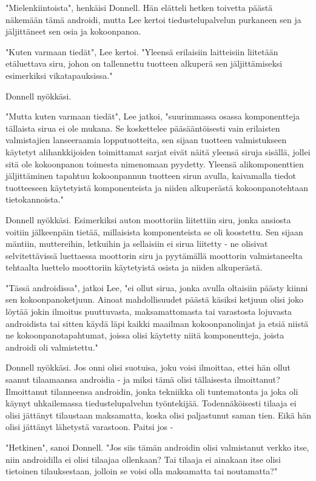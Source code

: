 "Mielenkiintoista", henkäisi Donnell. Hän elätteli hetken toivetta päästä näkemään tämä androidi, mutta Lee kertoi tiedustelupalvelun purkaneen sen ja jäljittäneet sen osia ja kokoonpanoa.


"Kuten varmaan tiedät", Lee kertoi. "Yleensä erilaisiin laitteisiin liitetään etäluettava siru, johon on tallennettu tuotteen alkuperä sen jäljittämiseksi esimerkiksi vikatapauksissa."


Donnell nyökkäsi.


"Mutta kuten varmaan tiedät", Lee jatkoi, "suurimmassa osassa komponentteja tällaista sirua ei ole mukana. Se koskettelee pääsääntöisesti vain erilaisten valmistajien lanseeraamia lopputuotteita, sen sijaan tuotteen valmistukseen käytetyt alihankkijoiden toimittamat sarjat eivät näitä yleensä siruja sisällä, jollei sitä ole kokoonpanon toimesta nimenomaan pyydetty. Yleensä alikomponenttien jäljittäminen tapahtuu kokoonpannun tuotteen sirun avulla, kaivamalla tiedot tuotteeseen käytetyistä komponenteista ja niiden alkuperästä kokoonpanotehtaan tietokannoista."


Donnell nyökkäsi. Esimerkiksi auton moottoriin liitettiin siru, jonka ansiosta voitiin jälkeenpäin tietää, millaisista komponenteista se oli koostettu. Sen sijaan mäntiin, muttereihin, letkuihin ja sellaisiin ei sirua liitetty - ne olisivat selvitettävissä luettaessa moottorin siru ja pyytämällä moottorin valmistaneelta tehtaalta luettelo moottoriin käytetyistä osista ja niiden alkuperästä.


"Tässä androidissa", jatkoi Lee, "ei ollut sirua, jonka avulla oltaisiin päästy kiinni sen kokoonpanoketjuun. Ainoat mahdollisuudet päästä käsiksi ketjuun olisi joko löytää jokin ilmoitus puuttuvasta, maksamattomasta tai varastosta lojuvasta androidista tai sitten käydä läpi kaikki maailman kokoonpanolinjat ja etsiä niistä ne kokoonpanotapahtumat, joissa olisi käytetty niitä komponentteja, joista androidi oli valmistettu."


Donnell nyökkäsi. Jos onni olisi suotuisa, joku voisi ilmoittaa, ettei hän ollut saanut tilaamaansa androidia - ja miksi tämä olisi tällaisesta ilmoittanut? Ilmoittanut tilanneensa androidin, jonka tekniikka oli tuntematonta ja joka oli käynyt uhkailemassa tiedustelupalvelun työntekijää. Todennäköisesti tilaaja ei olisi jättänyt tilaustaan maksamatta, koska olisi paljastunut saman tien. Eikä hän olisi jättänyt lähetystä varastoon. Paitsi jos -


"Hetkinen", sanoi Donnell. "Jos siis tämän androidin olisi valmistanut verkko itse, niin androidilla ei olisi tilaajaa ollenkaan? Tai tilaaja ei ainakaan itse olisi tietoinen tilauksestaan, jolloin se voisi olla maksamatta tai noutamatta?"


